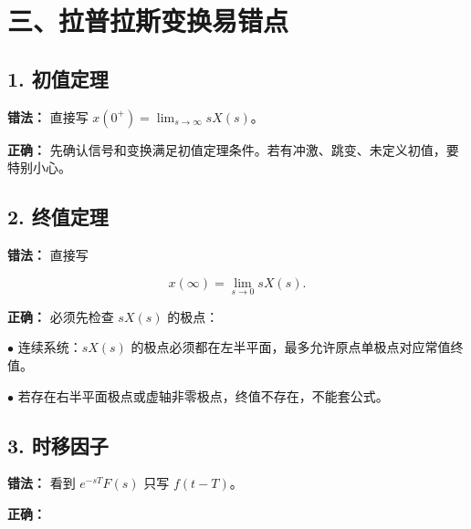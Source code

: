 \documentclass[11pt]{ctexart}
\begin{document}
\section*{三、拉普拉斯变换易错点}



\subsection*{1. 初值定理}



\textbf{错法：} 直接写 \(x(0^+)=\lim_{s\to\infty}sX(s)\)。\par



\textbf{正确：} 先确认信号和变换满足初值定理条件。若有冲激、跳变、未定义初值，要特别小心。\par



\subsection*{2. 终值定理}



\textbf{错法：} 直接写\par

\[

x(\infty)=\lim_{s\to0}sX(s).

\]



\textbf{正确：} 必须先检查 \(sX(s)\) 的极点：\par



\noindent\(\bullet\) 连续系统：\(sX(s)\) 的极点必须都在左半平面，最多允许原点单极点对应常值终值。\par

\noindent\(\bullet\) 若存在右半平面极点或虚轴非零极点，终值不存在，不能套公式。\par



\subsection*{3. 时移因子}



\textbf{错法：} 看到 \(e^{-sT}F(s)\) 只写 \(f(t-T)\)。\par



\textbf{正确：}\par
\end{document}
